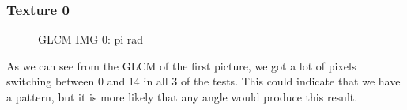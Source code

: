 \documentclass{article}
\begin{document}
	\subsubsection{Texture 0}
		\begin{figure}[h]%
			\centering
    		\qquad
    		\qquad
    		\qquad
    		\caption{GLCM IMG 0: pi rad}%
    		\label{fig:GLCM_0}%
		\end{figure}
		As we can see from the GLCM of the first picture, we got a lot of pixels switching between 0 and 14 in all 3 of the tests. This could indicate that we have a pattern, but it is more likely that any angle would produce this result. 
\newpage		
\end{document}
